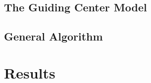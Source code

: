 \documentclass[proc]{edpsmath}
\begin{document}
\subsection{The Guiding Center Model}
\subsection{General Algorithm}

\section{Results}



\newpage


\end{document}

